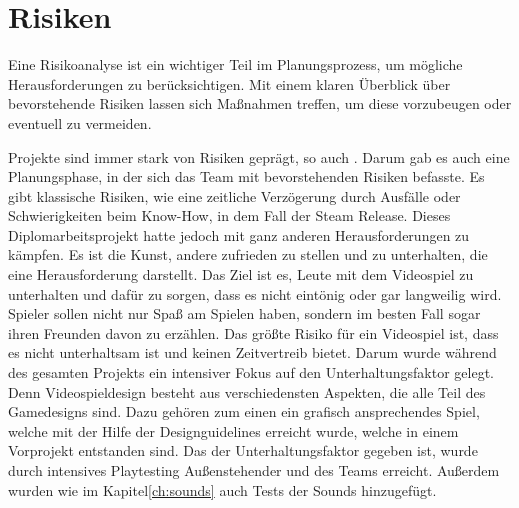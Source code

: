 
\section{Risiken}\label{sec:risiken}

\renewcommand{\kapitelautor}{Autor: Nils Hubmann}
%
Eine Risikoanalyse ist ein wichtiger Teil im Planungsprozess, um mögliche Herausforderungen zu berücksichtigen.
Mit einem klaren Überblick über bevorstehende Risiken lassen sich Maßnahmen treffen, um diese vorzubeugen oder eventuell zu vermeiden.

Projekte sind immer stark von Risiken geprägt, so auch \ff. Darum gab es auch eine Planungsphase, in der sich das Team mit bevorstehenden Risiken befasste.
Es gibt klassische Risiken, wie eine zeitliche Verzögerung durch Ausfälle oder Schwierigkeiten beim Know-How, in dem Fall der Steam Release.
Dieses Diplomarbeitsprojekt hatte jedoch mit ganz anderen Herausforderungen zu kämpfen. Es ist die Kunst, andere zufrieden zu stellen und zu unterhalten, die eine Herausforderung darstellt.
Das Ziel ist es, Leute mit dem Videospiel zu unterhalten und dafür zu sorgen, dass es nicht eintönig oder gar langweilig wird.
Spieler sollen nicht nur Spaß am Spielen haben, sondern im besten Fall sogar ihren Freunden davon zu erzählen.
Das größte Risiko für ein Videospiel ist, dass es nicht unterhaltsam ist und keinen Zeitvertreib bietet. Darum wurde während des gesamten Projekts ein intensiver Fokus auf den Unterhaltungsfaktor gelegt.
Denn Videospieldesign besteht aus verschiedensten Aspekten, die alle Teil des Gamedesigns sind.
Dazu gehören zum einen ein grafisch ansprechendes Spiel, welche mit der Hilfe der Designguidelines erreicht wurde, welche in einem Vorprojekt entstanden sind.
Das der Unterhaltungsfaktor gegeben ist, wurde durch intensives Playtesting Außenstehender und des Teams erreicht.
Außerdem wurden wie im Kapitel\ref{ch:sounds} auch Tests der Sounds hinzugefügt.
%

\renewcommand{\kapitelautor}{}
